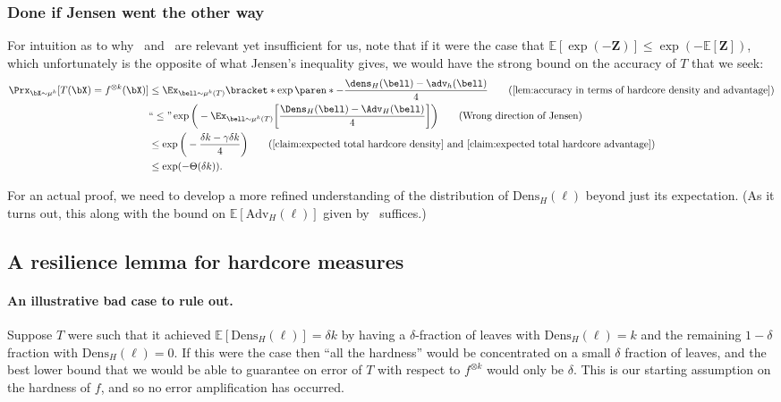 \subsubsection{Done if Jensen went the other way}
\label{sec:jensen}
For intuition as to why~ and~ are relevant yet insufficient for us, note that if it were the case that $\mathbb{E}[\exp(-\boldsymbol{Z})] \le \exp(-\mathbb{E}[\boldsymbol{Z}])$, which unfortunately is the opposite of what Jensen’s inequality gives, we would have the strong bound on the accuracy of $T$ that we seek:   
\begin{align*}
 \Prx_{\bX \sim \mu^k}[T(\bX) = f^{\otimes k}(\bX)] &\leq \Ex_{\bell \sim \mu^k(T)}\bracket*{\exp\paren*{-\frac{\dens_H(\bell) - \adv_h(\bell)}{4}}} \tag{\Cref{lem:accuracy in terms of hardcore density and advantage}} \\
 &``\le" \exp\bigg(- \Ex_{\bell\sim\mu^k(T)}\bigg[\frac{\Dens_H(\bell)-\Adv_H(\bell)}{4}\bigg] \bigg) \tag{Wrong direction of Jensen} \\
 &\le \exp\bigg(-\frac{\delta k -\gamma \delta k}{4} \bigg)  \tag{\Cref{claim:expected total hardcore density} and \Cref{claim:expected total hardcore advantage}} \\
 &\le \exp(-\Theta(\delta k)). 
\end{align*}

For an actual proof, we need to develop a more refined understanding of the distribution of $\mathrm{Dens}_H(\boldsymbol{\ell})$ beyond just its expectation. (As it turns out, this along with the bound on $\mathbb{E}[\mathrm{Adv}_H(\boldsymbol{\ell})]$ given by~ suffices.) 

\subsection{A resilience lemma for hardcore measures}


\paragraph{An illustrative bad case to rule out.} Suppose $T$ were such that it achieved $\mathbb{E}[\mathrm{Dens}_H(\boldsymbol{\ell})] =  \delta k$ by having a $\delta$-fraction of leaves with $\mathrm{Dens}_H(\ell) = k$ and the remaining $1-\delta$ fraction with $\mathrm{Dens}_H(\ell) = 0$. If this were the case then “all the hardness” would be concentrated on a small $\delta$ fraction of leaves, and the best lower bound that we would be able to guarantee on error of $T$ with respect to $f^{\otimes k}$ would only be $\delta$. This is our starting assumption on the hardness of $f$, and so no error amplification has occurred. 

